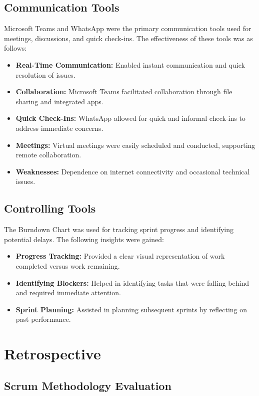 \documentclass[11pt,a4paper]{article}
\begin{document}
    \subsection{Communication Tools}\label{subsec:communication-tools}
    Microsoft Teams and WhatsApp were the primary communication tools used for meetings, discussions, and quick check-ins. The effectiveness of these tools was as follows:
    \begin{itemize}
        \item \textbf{Real-Time Communication:} Enabled instant communication and quick resolution of issues.
        \item \textbf{Collaboration:} Microsoft Teams facilitated collaboration through file sharing and integrated apps.
        \item \textbf{Quick Check-Ins:} WhatsApp allowed for quick and informal check-ins to address immediate concerns.
        \item \textbf{Meetings:} Virtual meetings were easily scheduled and conducted, supporting remote collaboration.
        \item \textbf{Weaknesses:} Dependence on internet connectivity and occasional technical issues.
    \end{itemize}

    \subsection{Controlling Tools}\label{subsec:controlling-tools}
    The Burndown Chart was used for tracking sprint progress and identifying potential delays. The following insights were gained:
    \begin{itemize}
        \item \textbf{Progress Tracking:} Provided a clear visual representation of work completed versus work remaining.
        \item \textbf{Identifying Blockers:} Helped in identifying tasks that were falling behind and required immediate attention.
        \item \textbf{Sprint Planning:} Assisted in planning subsequent sprints by reflecting on past performance.
    \end{itemize}

    \section{Retrospective}\label{sec:retrospective}

    \subsection{Scrum Methodology Evaluation}\label{subsec:scrum-methodology-evaluation}
\end{document}
